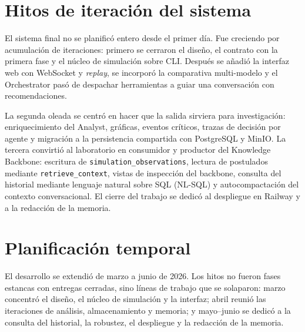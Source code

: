 \section{Hitos de iteración del sistema}

El sistema final no se planificó entero desde el primer día. Fue creciendo por
acumulación de iteraciones: primero se cerraron el diseño, el contrato con
la primera fase y el núcleo de simulación sobre CLI. Después se añadió la
interfaz web con WebSocket y \textit{replay}, se incorporó la comparativa
multi-modelo y el Orchestrator pasó de despachar herramientas a guiar una
conversación con recomendaciones.

La segunda oleada se centró en hacer que la salida sirviera para investigación:
enriquecimiento del Analyst, gráficas, eventos críticos, trazas de decisión
por agente y migración a la persistencia compartida con PostgreSQL y MinIO.
La tercera convirtió al laboratorio en consumidor y productor del Knowledge
Backbone: escritura de \texttt{simulation\_observations}, lectura de
postulados mediante \texttt{retrieve\_context}, vistas de inspección del
backbone, consulta del historial mediante lenguaje natural sobre SQL
(NL-SQL) y autocompactación del contexto conversacional. El cierre del
trabajo se dedicó al despliegue en Railway y a la redacción de la memoria.

\section{Planificación temporal}

El desarrollo se extendió de marzo a junio de 2026. Los hitos no fueron fases
estancas con entregas cerradas, sino líneas de trabajo que se solaparon: marzo
concentró el diseño, el núcleo de simulación y la interfaz; abril reunió las
iteraciones de análisis, almacenamiento y memoria; y mayo--junio se dedicó a
la consulta del historial, la robustez, el despliegue y la redacción de la
memoria.

